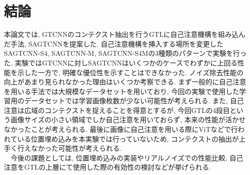 \chapter{結論}
本論文では, GTCNNのコンテクスト抽出を行うGTLに自己注意機構を組み込んだ手法, SAGTCNNを提案した. 自己注意機構を挿入する場所を変更したSAGTCNN-S4, SAGTCNN-M, SAGTCNN-S4Mの3種類のパターンで実験を行った. 実験ではGTCNNに対しSAGTCNNはいくつかのケースでわずかに上回る性能を示した一方で, 明確な優位性を示すことはできなかった. ノイズ除去性能の向上があまり見られなかった理由はいくつか考察できる. まず一般的に自己注意を用いる手法では大規模なデータセットを用いており, 今回の実験で使用した学習用のデータセットでは学習画像枚数が少ない可能性が考えられる. また, 自己注意は広域のコンテクストを捉えることを得意とするが, 今回GTLの4段目という画像サイズの小さい領域でしか自己注意を用いておらず, 本来の性能が活かせなかったことが考えられる. 最後に画像に自己注意を用いる際にViTなどで行われている位置埋め込みを本実験では行っていないため, コンテクストの抽出が上手く行えなかった可能性が考えられる. \\
　今後の課題としては, 位置埋め込みの実装やリアルノイズでの性能比較, 自己注意をGTLの上層にて使用した際の有効性の検討などが挙げられる. 